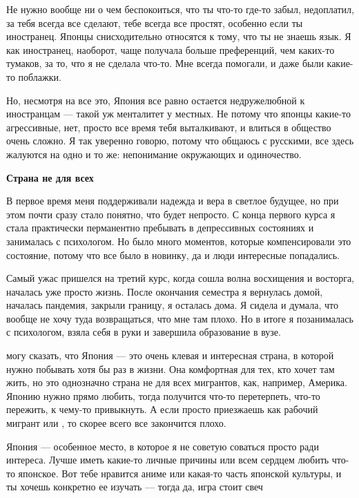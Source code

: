 Не нужно вообще ни о чем беспокоиться, что ты что-то где-то забыл, недоплатил, за тебя всегда все сделают, тебе всегда все простят, особенно если ты иностранец. Японцы снисходительно относятся к тому, что ты не знаешь язык. Я как иностранец, наоборот, чаще получала больше преференций, чем каких-то тумаков, за то, что я не сделала что-то. Мне всегда помогали, и даже были какие-то поблажки.

Но, несмотря на все это, Япония все равно остается недружелюбной к иностранцам — такой уж менталитет у местных. Не потому что японцы какие-то агрессивные, нет, просто все время тебя выталкивают, и влиться в общество очень сложно. Я так уверенно говорю, потому что общаюсь с русскими, все здесь жалуются на одно и то же: непонимание окружающих и одиночество.

\textbf{Страна не для всех}

В первое время меня поддерживали надежда и вера в светлое будущее, но при этом почти сразу стало понятно, что будет непросто. С конца первого курса я стала практически перманентно пребывать в депрессивных состояниях и занималась с психологом. Но было много моментов, которые компенсировали это состояние, потому что все было в новинку, да и люди интересные попадались.

Самый ужас пришелся на третий курс, когда сошла волна восхищения и восторга, началась уже просто жизнь. После окончания семестра я вернулась домой, началась пандемия, закрыли границу, я осталась дома. Я сидела и думала, что вообще не хочу туда возвращаться, что мне там плохо. Но в итоге я позанималась с психологом, взяла себя в руки и завершила образование в вузе.

 могу сказать, что Япония — это очень клевая и интересная страна, в которой нужно побывать хотя бы раз в жизни. Она комфортная для тех, кто хочет там жить, но это однозначно страна не для всех мигрантов, как, например, Америка. Японию нужно прямо любить, тогда получится что-то перетерпеть, что-то пережить, к чему-то привыкнуть. А если просто приезжаешь как рабочий мигрант или , то скорее всего все закончится плохо.

\begin{fancyquotes}
    Япония — особенное место, в которое я не советую соваться просто ради интереса. Лучше иметь какие-то личные причины или всем сердцем любить что-то японское. Вот тебе нравится аниме или какая-то часть японской культуры, и ты хочешь конкретно ее изучать — тогда да, игра стоит свеч
\end{fancyquotes}

